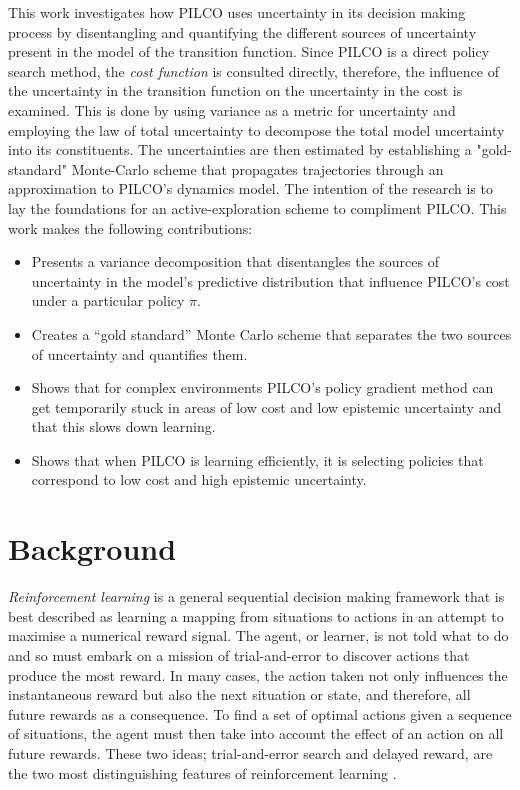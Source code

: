 This work investigates how PILCO uses uncertainty in its decision making process by disentangling and quantifying the different sources of uncertainty present in the model of the transition function. Since PILCO is a direct policy search method, the \textit{cost function} is consulted directly, therefore, the influence of the uncertainty in the transition function on the uncertainty in the cost is examined. This is done by using variance as a metric for uncertainty and employing the law of total uncertainty to decompose the total model uncertainty into its constituents. The uncertainties are then estimated by establishing a "gold-standard" Monte-Carlo scheme that propagates trajectories through an approximation to PILCO's dynamics model. The intention of the research is to lay the foundations for an active-exploration scheme to compliment PILCO. This work makes the following contributions:
\begin{itemize}
    \item Presents a variance decomposition that disentangles the sources of uncertainty in the model's predictive distribution that influence PILCO's cost under a particular policy $\pi$.
    \item Creates a “gold standard” Monte Carlo scheme that separates the two sources of uncertainty and quantifies them.
    \item Shows that for complex environments PILCO's policy gradient method can get temporarily stuck in areas of low cost and low epistemic uncertainty and that this slows down learning.
    \item Shows that when PILCO is learning efficiently, it is selecting policies that correspond to low cost and high epistemic uncertainty. 
\end{itemize}

\section{Background} %
\label{S:background}
\textit{Reinforcement learning} is a general sequential decision making framework that is best described as learning a mapping from situations to actions in an attempt to maximise a numerical reward signal. The agent, or learner, is not told what to do and so must embark on a mission of trial-and-error to discover actions that produce the most reward. In many cases, the action taken not only influences the instantaneous reward but also the next situation or state, and therefore, all future rewards as a consequence. To find a set of optimal actions given a sequence of situations, the agent must then take into account the effect of an action on all future rewards. These two ideas; trial-and-error search and delayed reward, are the two most distinguishing features of reinforcement learning \citep{sutton2018reinforcement}.

